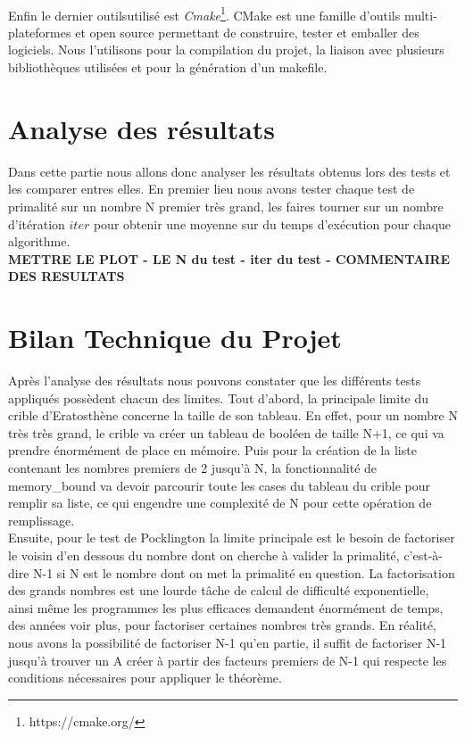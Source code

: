 		\paragraph{}Enfin le dernier outilsutilisé est \textit{Cmake}\footnote{https://cmake.org/}. CMake est une famille d'outils multi-plateformes et open source permettant de construire, tester et emballer des logiciels. Nous l'utilisons pour la compilation du projet, la liaison avec plusieurs bibliothèques utilisées et pour la génération d'un makefile. 
			
	\section{Analyse des résultats}
	Dans cette partie nous allons donc analyser les résultats obtenus lors des tests et les comparer entres elles. En premier lieu nous avons tester chaque test de primalité sur un nombre N premier très grand, les faires tourner sur un nombre d'itération $iter$ pour obtenir une moyenne sur du temps d'exécution pour chaque algorithme. \\
	
		\textbf{METTRE LE PLOT - LE N du test - iter du test - COMMENTAIRE DES RESULTATS}\\ 
	
	\section{Bilan Technique du Projet}	
		Après l'analyse des résultats nous pouvons constater que les différents tests appliqués possèdent chacun des limites.	
		Tout d'abord, la principale limite du crible d'Eratosthène concerne la taille de son tableau. En effet, pour un nombre N très très grand, le crible va créer un tableau de booléen de taille N+1, ce qui va prendre énormément de place en mémoire. Puis pour la création de la liste contenant les nombres premiers de 2 jusqu'à N, la fonctionnalité de memory\_bound va devoir parcourir toute les cases du tableau du crible pour remplir sa liste, ce qui engendre une complexité de N pour cette opération de remplissage.\\
		
		Ensuite, pour le test de Pocklington la limite principale est le besoin de factoriser le voisin d’en dessous du nombre dont on cherche à valider la primalité, c’est-à-dire N-1 si N est le nombre dont on met la primalité en question. La factorisation des grands nombres est une lourde tâche de calcul de difficulté exponentielle, ainsi même les programmes les plus efficaces demandent énormément de temps, des années voir plus, pour factoriser certaines nombres très grands.
En réalité, nous avons la possibilité de factoriser N-1 qu’en partie, il suffit de factoriser N-1 jusqu’à trouver un A créer à partir des facteurs premiers de N-1 qui respecte les conditions nécessaires pour appliquer le théorème.\\

